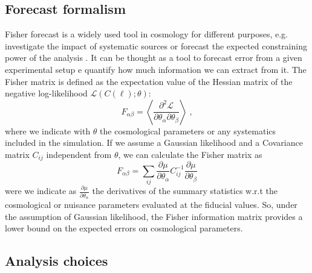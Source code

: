 \documentclass[twocolumn,twocolappendix]{aastex63}
\begin{document}
\subsection{Forecast formalism}
Fisher forecast is a widely used tool in cosmology for different purposes, e.g. investigate the impact of systematic sources or forecast the expected constraining power of the analysis \citep{tegmark1997karhunen}. It can be thought as a tool to forecast error from a given experimental setup e quantify how much information we can extract from it. 
The Fisher matrix is defined as the expectation value of the Hessian matrix of the negative log-likelihood $\mathcal{L}(C(\ell);\theta)$:
\begin{equation}
    F_{\alpha \beta}=\left \langle 
    \frac{\partial^2\mathcal{L}}
    {\partial \theta_{\alpha}\partial \theta_{\beta}}
    \right \rangle \;,
\end{equation}
where we indicate with $\theta$ the cosmological parameters or any systematics included in the simulation.
If we assume a Gaussian likelihood and a Covariance matrix $C_{ij}$ independent from $\theta$, we can calculate the Fisher matrix as
\begin{equation}\label{Fisher_matrix}
      F_{\alpha \beta}= \sum_{ij}\frac{\partial \mu}{\partial \theta_{\alpha}} C_{ij}^{-1}
      \frac{\partial \mu}{\partial \theta_{\beta}}
\end{equation}
were we indicate as $ \frac{\partial \mu}{\partial \theta_{\alpha}} $ the derivatives of the summary statistics w.r.t the cosmological or nuisance parameters evaluated at the fiducial values. So, under the assumption of Gaussian likelihood, the Fisher information matrix provides a lower bound on the expected errors on cosmological parameters. 

\subsection{Analysis choices} \label{Analysis_choices}
\end{document}

